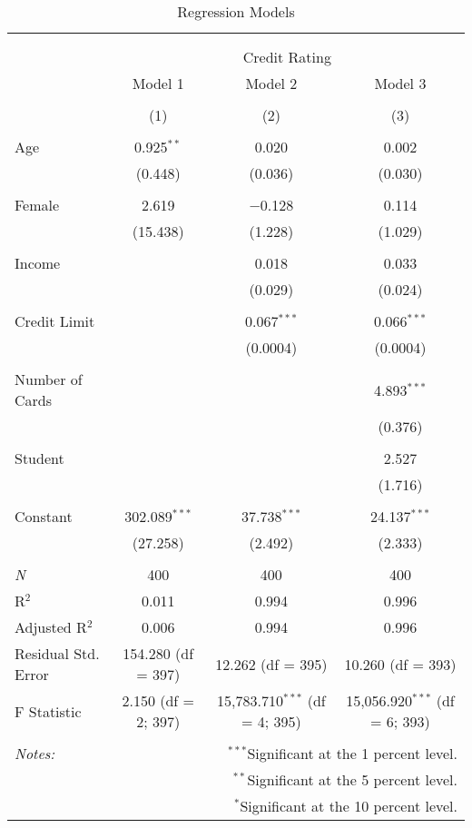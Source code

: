 
\begin{table}[!htbp] \centering 
  \caption{Regression Models} 
  \label{} 
\begin{tabular}{@{\extracolsep{5pt}}lccc} 
\\[-1.8ex]\hline 
\hline \\[-1.8ex] 
\\[-1.8ex] & \multicolumn{3}{c}{Credit Rating} \\ 
 & Model 1 & Model 2 & Model 3 \\ 
\\[-1.8ex] & (1) & (2) & (3)\\ 
\hline \\[-1.8ex] 
 Age & 0.925$^{**}$ & 0.020 & 0.002 \\ 
  & (0.448) & (0.036) & (0.030) \\ 
  & & & \\ 
 Female & 2.619 & $-$0.128 & 0.114 \\ 
  & (15.438) & (1.228) & (1.029) \\ 
  & & & \\ 
 Income &  & 0.018 & 0.033 \\ 
  &  & (0.029) & (0.024) \\ 
  & & & \\ 
 Credit Limit &  & 0.067$^{***}$ & 0.066$^{***}$ \\ 
  &  & (0.0004) & (0.0004) \\ 
  & & & \\ 
 Number of Cards &  &  & 4.893$^{***}$ \\ 
  &  &  & (0.376) \\ 
  & & & \\ 
 Student &  &  & 2.527 \\ 
  &  &  & (1.716) \\ 
  & & & \\ 
 Constant & 302.089$^{***}$ & 37.738$^{***}$ & 24.137$^{***}$ \\ 
  & (27.258) & (2.492) & (2.333) \\ 
  & & & \\ 
\textit{N} & 400 & 400 & 400 \\ 
R$^{2}$ & 0.011 & 0.994 & 0.996 \\ 
Adjusted R$^{2}$ & 0.006 & 0.994 & 0.996 \\ 
Residual Std. Error & 154.280 (df = 397) & 12.262 (df = 395) & 10.260 (df = 393) \\ 
F Statistic & 2.150 (df = 2; 397) & 15,783.710$^{***}$ (df = 4; 395) & 15,056.920$^{***}$ (df = 6; 393) \\ 
\hline 
\hline \\[-1.8ex] 
\textit{Notes:} & \multicolumn{3}{r}{$^{***}$Significant at the 1 percent level.} \\ 
 & \multicolumn{3}{r}{$^{**}$Significant at the 5 percent level.} \\ 
 & \multicolumn{3}{r}{$^{*}$Significant at the 10 percent level.} \\ 
\end{tabular} 
\end{table} 
